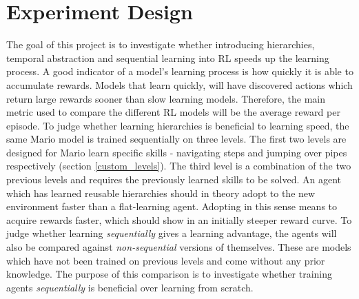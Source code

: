 \documentclass[notitlepage,a4paper,11pt]{article}
\begin{document}
\section{Experiment Design}
The goal of this project is to investigate whether introducing hierarchies, temporal abstraction and sequential learning into RL speeds up the learning process. A good indicator of a model's learning process is how quickly it is able to accumulate rewards. Models that learn quickly, will have discovered actions which return large rewards sooner than slow learning models. Therefore, the main metric used to compare the different RL models will be the average reward per episode. To judge whether learning hierarchies is beneficial to learning speed, the same Mario model is trained sequentially on three levels. The first two levels are designed for Mario learn specific skills - navigating steps and jumping over pipes respectively (section \ref{custom_levels}). The third level is a combination of the two previous levels and requires the previously learned skills to be solved. An agent which has learned reusable hierarchies should in theory adopt to the new environment faster than a flat-learning agent. Adopting in this sense means to acquire rewards faster, which should show in an initially steeper reward curve. To judge whether learning \textit{sequentially} gives a learning advantage, the agents will also be compared against \textit{non-sequential} versions of themselves. These are models which have not been trained on previous levels and come without any prior knowledge. The purpose of this comparison is to investigate whether training agents \textit{sequentially} is beneficial over learning from scratch.
\end{document}
